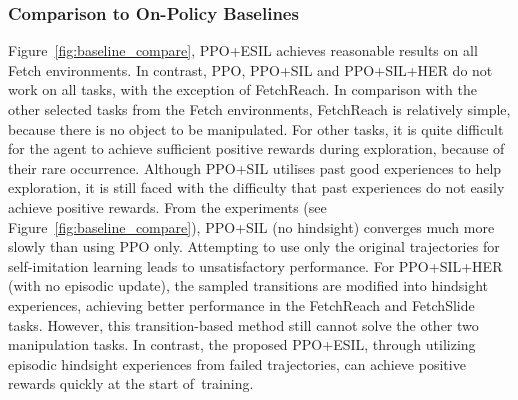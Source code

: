 \subsubsection{Comparison to On-Policy Baselines}
{Figure~\ref{fig:baseline_compare}, PPO+ESIL} achieves reasonable results on all Fetch environments. {In contrast}, PPO, PPO+SIL and PPO+SIL+HER do not work on all tasks, with the exception of FetchReach. In comparison with the other selected tasks from the Fetch environments, FetchReach is relatively simple, because there is no object to be manipulated. For other tasks, it is quite difficult for the agent to achieve sufficient positive rewards during exploration, because of their rare occurrence. Although PPO+SIL utilises past good experiences to help exploration, it is still faced with the difficulty that past experiences do not easily achieve positive rewards. From the experiments ({see Figure~\ref{fig:baseline_compare}}), PPO+SIL (no hindsight) converges much more slowly than using PPO only. Attempting to use only the original trajectories for self-imitation learning leads to unsatisfactory performance. For PPO+SIL+HER (with no episodic update), the sampled transitions are modified into hindsight experiences, achieving better performance in the FetchReach and FetchSlide tasks. However, this transition-based method still cannot solve the other two manipulation tasks. In contrast, the proposed PPO+ESIL, through utilizing episodic hindsight experiences from failed trajectories, can achieve positive rewards quickly at the start of~training.

